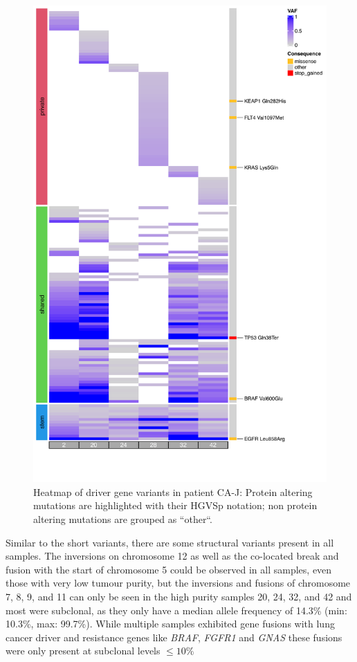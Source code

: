 \begin{figure}[ht]
\centering
\includegraphics[width=.99\linewidth]{Figures/CASCADE/CA80/CA80varHeatmap.pdf}
\caption[Heatmap of driver gene variants in patient CA-J]{Heatmap of driver gene variants in patient CA-J: Protein altering mutations are highlighted with their HGVSp notation; non protein altering mutations are grouped as ``other``.} \label{fig:cas80heatmap}
\end{figure}



Similar to the short variants, there are some structural variants present in all samples. The inversions on chromosome 12 as well as the co-located break and fusion with the start of chromosome 5 could be observed in all samples, even those with very low tumour purity, but the inversions and fusions of chromosome 7, 8, 9, and 11 can only be seen in the high purity samples 20, 24, 32, and 42 and most were subclonal, as they only have a median allele frequency of 14.3\% (min: 10.3\%, max: 99.7\%).
While multiple samples exhibited gene fusions with lung cancer driver and resistance genes like \textit{BRAF}, \textit{FGFR1} and \textit{GNAS} these fusions were only present at subclonal levels $\leq 10\%$

